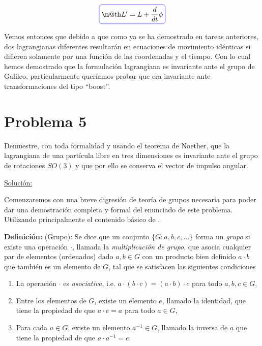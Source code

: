 \documentclass[a4paper,10pt]{article}
\makeatletter
\numberwithin{equation}{section}
\newcommand*{\boxcolor}{blue}
\renewcommand{\boxed}[1]{\textcolor{\boxcolor}{%
\tikz[baseline={([yshift=-1ex]current bounding box.center)}] \node [rectangle, minimum width=1ex,rounded corners,draw] {\normalcolor\m@th$\displaystyle#1$};}}
\newcommand{\definicion}{\textbf{Definición: }}
\makeatother
\begin{document}
\begin{equation}
 \boxed{L' = L + \frac{d}{dt}\phi}
\end{equation}

Vemos entonces que debido a que como ya se ha demostrado en tareas anteriores, dos lagrangianas 
diferentes resultarán en ecuaciones de movimiento idénticas si difieren solamente 
por una función de las coordenadas y el tiempo. Con lo cual hemos demostrado que 
la formulación lagrangiana es invariante ante el grupo de Galileo, particularmente 
queríamos probar que era invariante ante transformaciones del tipo ``boost''.

\section{Problema 5}

Demuestre, con toda formalidad y usando el teorema de Noether, que la lagrangiana 
de una partícula libre en tres dimensiones es invariante ante el grupo de rotaciones 
$SO(3)$ y que por ello se conserva el vector de impulso angular.

\vspace{.3cm}

\underline{Solución:} \vspace{.3cm}

Comenzaremos con una breve digresión de teoría de grupos necesaria para poder dar una 
demostración completa y formal del enunciado de este problema. Utilizando principalmente 
el contenido básico de \cite{tung}.

\vspace{.3cm}

\definicion (Grupo): Se dice que un conjunto $\{G:a,b,c,\dots\}$ forma un \emph{grupo}
si existe una operación $\cdot$, llamada la \emph{multiplicación de grupo}, que asocia 
cualquier par de elementos (ordenados) dado $a,b \in G$ con un producto bien definido 
$a\cdot b$ que también es un elemento de $G$, tal que se satisfacen las siguientes 
condiciones 

\begin{enumerate}[label=(\alph*)]
 \item La operación $\cdot$ es \emph{asociativa}, i.e. $a\cdot (b\cdot c) = (a\cdot b)\cdot c$ 
 para todo $a,b,c \in G$,
 \item Entre los elementos de $G$, existe un elemento $e$, llamado la identidad, que 
 tiene la propiedad de que $a\cdot e = a$ para todo $a \in G$,
 \item Para cada $a \in G$, existe un elemento $a^{-1} \in G$, llamado la inversa 
 de $a$ que tiene la propiedad de que $a\cdot a^{-1} = e$.
\end{enumerate}
\end{document}
